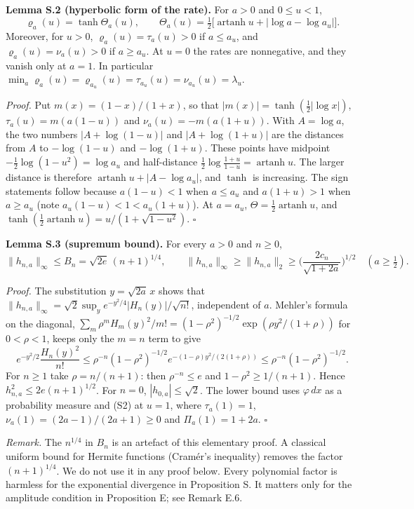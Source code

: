 \documentclass[
  british,
  10pt,
]{article}
\begin{document}
\textbf{Lemma S.2 (hyperbolic form of the rate).} For \(a>0\) and
\(0\le u<1\), \[
\varrho_a(u)=\tanh\Theta_a(u),\qquad
\Theta_a(u)=\tfrac12\Big[\operatorname{artanh}u+\big|\log a-\log a_u\big|\Big].
\tag{S3}
\] Moreover, for \(u>0\), \(\varrho_a(u)=\tau_a(u)>0\) if \(a\le a_u\),
and \(\varrho_a(u)=\nu_a(u)>0\) if \(a\ge a_u\). At \(u=0\) the rates
are nonnegative, and they vanish only at \(a=1\). In particular
\(\min_a\varrho_a(u)=\varrho_{a_u}(u)=\tau_{a_u}(u)=\nu_{a_u}(u)=\lambda_u\).

\emph{Proof.} Put \(m(x)=(1-x)/(1+x)\), so that
\(|m(x)|=\tanh(\frac12|\log x|)\), \(\tau_a(u)=m(a(1-u))\) and
\(\nu_a(u)=-m(a(1+u))\). With \(A=\log a\), the two numbers
\(|A+\log(1-u)|\) and \(|A+\log(1+u)|\) are the distances from \(A\) to
\(-\log(1-u)\) and \(-\log(1+u)\). These points have midpoint
\(-\frac12\log(1-u^2)=\log a_u\) and half-distance
\(\frac12\log\frac{1+u}{1-u}=\operatorname{artanh}u\). The larger
distance is therefore \(\operatorname{artanh}u+|A-\log a_u|\), and
\(\tanh\) is increasing. The sign statements follow because \(a(1-u)<1\)
when \(a\le a_u\) and \(a(1+u)>1\) when \(a\ge a_u\) (note
\(a_u(1-u)<1<a_u(1+u)\)). At \(a=a_u\),
\(\Theta=\frac12\operatorname{artanh}u\), and
\(\tanh(\frac12\operatorname{artanh}u)=u/(1+\sqrt{1-u^2})\). \(\square\)

\textbf{Lemma S.3 (supremum bound).} For every \(a>0\) and \(n\ge0\), \[
\|h_{n,a}\|_\infty\le B_n=\sqrt{2e}\,(n+1)^{1/4},
\qquad
\|h_{n,a}\|_\infty\ge\|h_{n,a}\|_2\ge\Big(\frac{2c_n}{\sqrt{1+2a}}\Big)^{1/2}\quad(a\ge\tfrac12).
\tag{S6}
\]

\emph{Proof.} The substitution \(y=\sqrt{2a}\,x\) shows that
\(\|h_{n,a}\|_\infty=\sqrt2\sup_ye^{-y^2/4}|H_n(y)|/\sqrt{n!}\),
independent of \(a\). Mehler's formula on the diagonal,
\(\sum_m\rho^mH_m(y)^2/m!=(1-\rho^2)^{-1/2}\exp(\rho y^2/(1+\rho))\) for
\(0<\rho<1\), keeps only the \(m=n\) term to give \[
e^{-y^2/2}\frac{H_n(y)^2}{n!}\le\rho^{-n}(1-\rho^2)^{-1/2}e^{-(1-\rho)y^2/(2(1+\rho))}\le\rho^{-n}(1-\rho^2)^{-1/2}.
\] For \(n\ge1\) take \(\rho=n/(n+1)\): then \(\rho^{-n}\le e\) and
\(1-\rho^2\ge1/(n+1)\). Hence \(h_{n,a}^2\le2e(n+1)^{1/2}\). For
\(n=0\), \(|h_{0,a}|\le\sqrt2\). The lower bound uses \(\varphi\,dx\) as
a probability measure and (S2) at \(u=1\), where \(\tau_a(1)=1\),
\(\nu_a(1)=(2a-1)/(2a+1)\ge0\) and \(\Pi_a(1)=1+2a\). \(\square\)

\emph{Remark.} The \(n^{1/4}\) in \(B_n\) is an artefact of this
elementary proof. A classical uniform bound for Hermite functions
(Cramér's inequality) removes the factor \((n+1)^{1/4}\). We do not use
it in any proof below. Every polynomial factor is harmless for the
exponential divergence in Proposition S. It matters only for the
amplitude condition in Proposition E; see Remark E.6.
\end{document}
